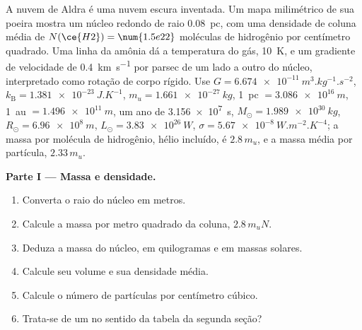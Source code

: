 \begin{problem}
\label{pb:b2:ism-star-formation:1}
A nuvem de Aldra é uma nuvem escura inventada. Um mapa milimétrico de sua poeira
mostra um núcleo redondo de raio \qty{0.08}{pc}, com uma densidade de coluna média de
$N(\ce{H2}) = \num{1.5e22}$ moléculas de hidrogênio por centímetro quadrado. Uma
linha da amônia dá a temperatura do gás, \qty{10}{K}, e um gradiente de
velocidade de \qty{0.4}{km.s^{-1}} por parsec de um lado a outro do núcleo, interpretado como rotação
de corpo rígido. Use $G = \qty{6.674e-11}{m^3.kg^{-1}.s^{-2}}$,
$k_{\mathrm B} = \qty{1.381e-23}{J.K^{-1}}$, $m_u = \qty{1.661e-27}{kg}$,
\qty{1}{pc} $= \qty{3.086e16}{m}$, \qty{1}{au} $= \qty{1.496e11}{m}$, um ano de
\qty{3.156e7}{s}, $M_\odot = \qty{1.989e30}{kg}$, $R_\odot = \qty{6.96e8}{m}$,
$L_\odot = \qty{3.83e26}{W}$, $\sigma = \qty{5.67e-8}{W.m^{-2}.K^{-4}}$; a
massa por molécula de hidrogênio, hélio incluído, é $2.8\,m_u$, e a massa média
por partícula, $2.33\,m_u$.

\medskip
\noindent\textbf{Parte I --- Massa e densidade.}
\begin{enumerate}
  \item Converta o raio do núcleo em metros.
  \item Calcule a massa por metro quadrado da coluna, $2.8\,m_u N$.
  \item Deduza a massa do núcleo, em quilogramas e em massas solares.
  \item Calcule seu volume e sua densidade média.
  \item Calcule o número de partículas por centímetro cúbico.
  \item Trata-se de um  no sentido da tabela da segunda seção?
\end{enumerate}


\end{problem}
